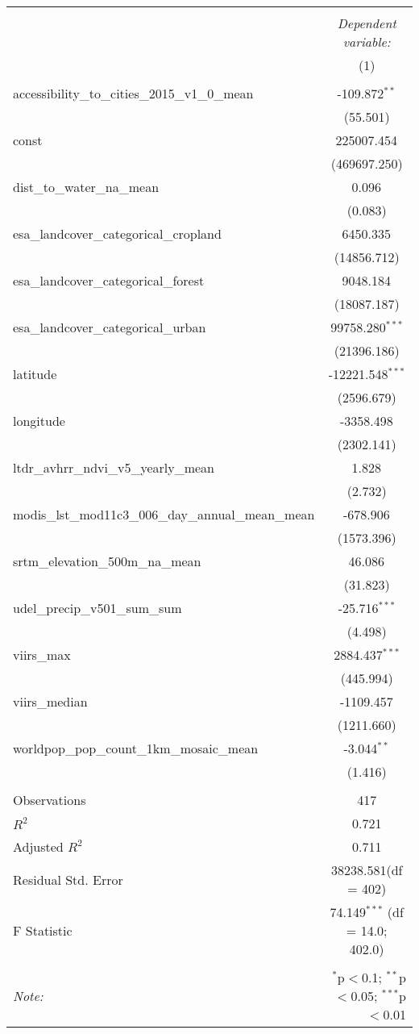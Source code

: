 \begin{table}[!htbp] \centering
\begin{tabular}{@{\extracolsep{5pt}}lc}
\\[-1.8ex]\hline
\hline \\[-1.8ex]
& \multicolumn{1}{c}{\textit{Dependent variable:}} \
\cr \cline{1-2}
\\[-1.8ex] & (1) \\
\hline \\[-1.8ex]
 accessibility_to_cities_2015_v1_0_mean & -109.872$^{**}$ \\
  & (55.501) \\
 const & 225007.454$^{}$ \\
  & (469697.250) \\
 dist_to_water_na_mean & 0.096$^{}$ \\
  & (0.083) \\
 esa_landcover_categorical_cropland & 6450.335$^{}$ \\
  & (14856.712) \\
 esa_landcover_categorical_forest & 9048.184$^{}$ \\
  & (18087.187) \\
 esa_landcover_categorical_urban & 99758.280$^{***}$ \\
  & (21396.186) \\
 latitude & -12221.548$^{***}$ \\
  & (2596.679) \\
 longitude & -3358.498$^{}$ \\
  & (2302.141) \\
 ltdr_avhrr_ndvi_v5_yearly_mean & 1.828$^{}$ \\
  & (2.732) \\
 modis_lst_mod11c3_006_day_annual_mean_mean & -678.906$^{}$ \\
  & (1573.396) \\
 srtm_elevation_500m_na_mean & 46.086$^{}$ \\
  & (31.823) \\
 udel_precip_v501_sum_sum & -25.716$^{***}$ \\
  & (4.498) \\
 viirs_max & 2884.437$^{***}$ \\
  & (445.994) \\
 viirs_median & -1109.457$^{}$ \\
  & (1211.660) \\
 worldpop_pop_count_1km_mosaic_mean & -3.044$^{**}$ \\
  & (1.416) \\
\hline \\[-1.8ex]
 Observations & 417 \\
 $R^2$ & 0.721 \\
 Adjusted $R^2$ & 0.711 \\
 Residual Std. Error & 38238.581(df = 402)  \\
 F Statistic & 74.149$^{***}$ (df = 14.0; 402.0) \\
\hline
\hline \\[-1.8ex]
\textit{Note:} & \multicolumn{1}{r}{$^{*}$p$<$0.1; $^{**}$p$<$0.05; $^{***}$p$<$0.01} \\
\end{tabular}
\end{table}